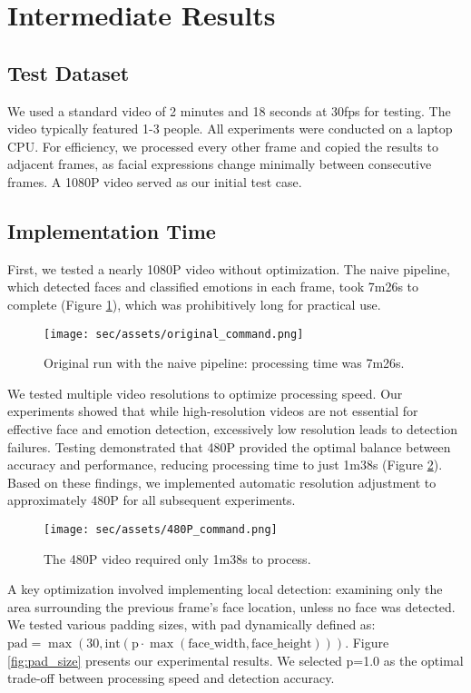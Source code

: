 \section{Intermediate Results}
\subsection{Test Dataset}
We used a standard video of 2 minutes and 18 seconds at 30fps for testing. The video typically featured 1-3 people. All experiments were conducted on a laptop CPU. For efficiency, we processed every other frame and copied the results to adjacent frames, as facial expressions change minimally between consecutive frames. A 1080P video served as our initial test case.

\subsection{Implementation Time}
First, we tested a nearly 1080P video without optimization. The naive pipeline, which detected faces and classified emotions in each frame, took 7m26s to complete (Figure \ref{fig:original_command}), which was prohibitively long for practical use.
\begin{figure}[h]
	\centering
	 \texttt{[image: sec/assets/original\_command.png]}
	 \caption{Original run with the naive pipeline: processing time was 7m26s.}
	 \label{fig:original_command}
\end{figure}

We tested multiple video resolutions to optimize processing speed. Our experiments showed that while high-resolution videos are not essential for effective face and emotion detection, excessively low resolution leads to detection failures. Testing demonstrated that 480P provided the optimal balance between accuracy and performance, reducing processing time to just 1m38s (Figure \ref{fig:480P_command}). Based on these findings, we implemented automatic resolution adjustment to approximately 480P for all subsequent experiments.
\begin{figure}[h]
	\centering
	 \texttt{[image: sec/assets/480P\_command.png]}
	 \caption{The 480P video required only 1m38s to process.}
	 \label{fig:480P_command}
\end{figure}

A key optimization involved implementing local detection: examining only the area surrounding the previous frame's face location, unless no face was detected. We tested various padding sizes, with pad dynamically defined as: $\text{pad} = \max(30, \text{int}(\text{p} \cdot \max(\text{face\_width}, \text{face\_height})))$. Figure \ref{fig:pad_size} presents our experimental results. We selected p=1.0 as the optimal trade-off between processing speed and detection accuracy.

